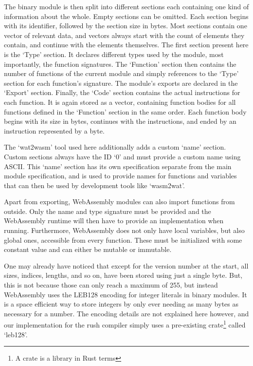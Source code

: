 The binary module is then split into different sections each containing one kind of information about the whole.
Empty sections can be omitted.
Each section begins with its identifier, followed by the section size in bytes.
Most sections contain one vector of relevant data, and vectors always start with the count of elements they contain, and continue with the elements themselves.
The first section present here is the `Type' section.
It declares different types used by the module, most importantly, the function signatures.
The `Function' section then contains the number of functions of the current module and simply references to the `Type' section for each function's signature.
The module's exports are declared in the `Export' section.
Finally, the `Code' section contains the actual instructions for each function.
It is again stored as a vector, containing function bodies for all functions defined in the `Function' section in the same order.
Each function body begins with its size in bytes, continues with the instructions, and ended by an  instruction represented by a  byte.

The `wat2wasm' tool used here additionally adds a custom `name' section.
Custom sections always have the ID `0' and must provide a custom name using ASCII.
This `name' section has its own specification separate from the main module specification, and is used to provide names for functions and variables that can then be used by development tools like `wasm2wat'.

Apart from exporting, WebAssembly modules can also import functions from outside.
Only the name and type signature must be provided and the WebAssembly runtime will then have to provide an implementation when running.
Furthermore, WebAssembly does not only have local variables, but also global ones, accessible from every function.
These must be initialized with some constant value and can either be mutable or immutable.

One may already have noticed that except for the version number at the start, all sizes, indices, lengths, and so on, have been stored using just a single byte.
But, this is not because those can only reach a maximum of 255, but instead WebAssembly uses the LEB128 encoding for integer literals in binary modules.
It is a space efficient way to store integers by only ever needing as many bytes as necessary for a number.
The encoding details are not explained here however, and our implementation for the rush compiler simply uses a pre-existing crate\footnote{A crate is a library in Rust terms} called `leb128'.

